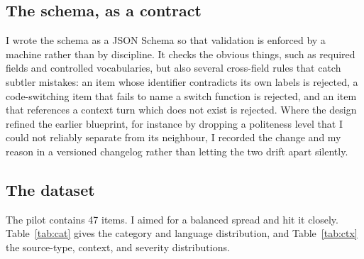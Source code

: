 \documentclass[11pt]{article}
\begin{document}
\subsection{The schema, as a contract}
I wrote the schema as a JSON Schema so that validation is enforced by a machine
rather than by discipline. It checks the obvious things, such as required fields
and controlled vocabularies, but also several cross-field rules that catch subtler
mistakes: an item whose identifier contradicts its own labels is rejected, a
code-switching item that fails to name a switch function is rejected, and an item
that references a context turn which does not exist is rejected. Where the design
refined the earlier blueprint, for instance by dropping a politeness level that I
could not reliably separate from its neighbour, I recorded the change and my reason
in a versioned changelog rather than letting the two drift apart silently.

\subsection{The dataset}
The pilot contains 47 items. I aimed for a balanced spread and hit it closely.
Table~\ref{tab:cat} gives the category and language distribution, and
Table~\ref{tab:ctx} the source-type, context, and severity distributions.
\end{document}
